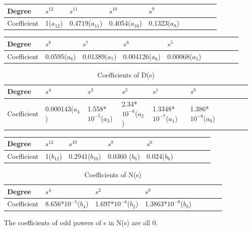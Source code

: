 \documentclass[12pt]{article}
\begin{document}
\begin{table}[h!]
\centering
\begin{tabular}{|l|l|l|l|l|l|l|l|l|l|}\hline
Degree & $s^{12}$ & $s^{11}$ & $s^{10}$ & $s^{9}$ \\ \hline
Coefficient & 1($a_{12}$) & 0.4719($a_{11}$) & 0.4054($a_{10}$) & 0.1323($a_{9}$) \\\hline
\end{tabular}
\end{table}
\begin{table}[h!]
\centering
\begin{tabular}{|l|l|l|l|l|l|l|l|l|l|}\hline
Degree & $s^{8}$ & $s^{7}$ & $s^{6}$ & $s^{5}$ \\ \hline
Coefficient & 0.0595($a_{8}$) & 0.01389($a_{7}$) & 0.004126($a_{6}$) & 0.00068($a_{5}$) \\\hline
\end{tabular}
\end{table}
\begin{table}[h!]
\centering
\begin{tabular}{|l|l|l|l|l|l|l|l|l|l|}\hline
Degree & $s^{4}$ & $s^{3}$ & $s^{2}$ & $s^{1}$ & $s^{0}$ \\ \hline
Coefficient & 0.000143($a_{4}$) & 1.558*$10^{-5}$($a_{3}$) & 2.34*$10^{-6}$($a_{2}$) & 1.3348*$10^{-7}$($a_{1}$) & 1.386*$10^{-8}$($a_{0}$) \\\hline
\end{tabular}
\caption{\label{tab:widgets}Coefficients of D(s)}
\end{table}

\newpage
\begin{table}[h!]
\centering
\begin{tabular}{|l|l|l|l|l|l|l|l|l|l|}\hline
Degree & $s^{12}$ & $s^{10}$ & $s^{8}$ & $s^{6}$ \\ \hline
Coefficient & 1($b_{12}$) &  0.2941($b_{10}$) &  0.0360  ($b_{8}$)   & 0.024($b_{6}$) \\\hline
\end{tabular}
\end{table}
\begin{table}[h!]
\centering
\begin{tabular}{|l|l|l|l|l|l|l|l|}\hline
Degree & $s^{4}$ &$s^{2}$ &$s^{0}$ \\ \hline
Coefficient &8.656*$10^{-5}$($b_{4}$)&  1.697*$10^{-6}$($b_{2}$)  & 1.3863*$10^{-8}$($b_{0}$)  \\\hline
\end{tabular}
\caption{\label{tab:widgets1}Coefficients of N(s)}
\end{table}
The coefficients of odd powers of s in N(s) are all 0.

\end{document}
